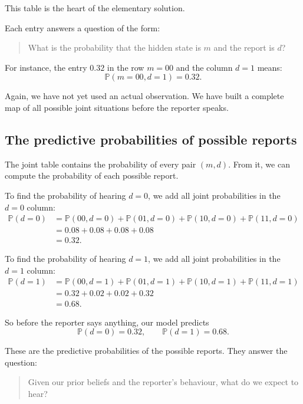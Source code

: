 \documentclass[11pt]{article}
\begin{document}
This table is the heart of the elementary solution.

Each entry answers a question of the form:

\begin{quote}
    What is the probability that the hidden state is \(m\) and the report is \(d\)?
\end{quote}

For instance, the entry \(0.32\) in the row \(m=00\) and the column \(d=1\) means:
\[
    \mathbb{P}(m=00,d=1)=0.32.
\]

Again, we have not yet used an actual observation. We have built a complete map of all possible joint situations before the reporter speaks.

\subsection{The predictive probabilities of possible reports}

The joint table contains the probability of every pair \((m,d)\). From it, we can compute the probability of each possible report.

To find the probability of hearing \(d=0\), we add all joint probabilities in the \(d=0\) column:
\[
\begin{aligned}
    \mathbb{P}(d=0)
    &=
    \mathbb{P}(00,d=0)
    +
    \mathbb{P}(01,d=0)
    +
    \mathbb{P}(10,d=0)
    +
    \mathbb{P}(11,d=0)
    \\
    &=
    0.08+0.08+0.08+0.08
    \\
    &=
    0.32.
\end{aligned}
\]

To find the probability of hearing \(d=1\), we add all joint probabilities in the \(d=1\) column:
\[
\begin{aligned}
    \mathbb{P}(d=1)
    &=
    \mathbb{P}(00,d=1)
    +
    \mathbb{P}(01,d=1)
    +
    \mathbb{P}(10,d=1)
    +
    \mathbb{P}(11,d=1)
    \\
    &=
    0.32+0.02+0.02+0.32
    \\
    &=
    0.68.
\end{aligned}
\]

So before the reporter says anything, our model predicts
\[
    \mathbb{P}(d=0)=0.32,
    \qquad
    \mathbb{P}(d=1)=0.68.
\]

These are the predictive probabilities of the possible reports. They answer the question:

\begin{quote}
    Given our prior beliefs and the reporter's behaviour, what do we expect to hear?
\end{quote}
\end{document}
